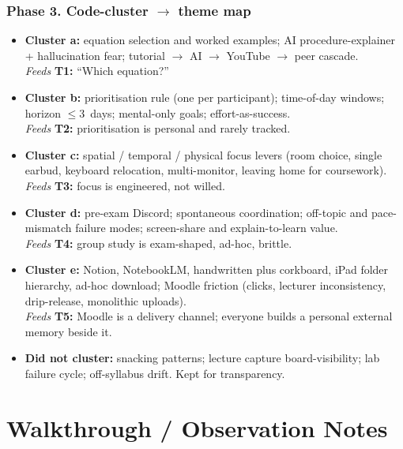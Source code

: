 \documentclass[a4paper,11pt]{article}
\begin{document}
\subsubsection*{Phase 3. Code-cluster $\rightarrow$ theme map}
\label{app:analysis-clusters}

\begin{itemize}[leftmargin=1.2em,itemsep=4pt]
    \item \textbf{Cluster a:} equation selection and worked
          examples; AI procedure-explainer + hallucination fear;
          tutorial $\rightarrow$ AI $\rightarrow$ YouTube
          $\rightarrow$ peer cascade.
          \\\emph{Feeds} \textbf{T1:} ``Which equation?''
    \item \textbf{Cluster b:} prioritisation rule (one per
          participant); time-of-day windows; horizon ${\leq}3$~days;
          mental-only goals; effort-as-success.
          \\\emph{Feeds} \textbf{T2:} prioritisation is personal and
          rarely tracked.
    \item \textbf{Cluster c:} spatial / temporal / physical
          focus levers (room choice, single earbud, keyboard
          relocation, multi-monitor, leaving home for coursework).
          \\\emph{Feeds} \textbf{T3:} focus is engineered, not willed.
    \item \textbf{Cluster d:} pre-exam Discord; spontaneous
          coordination; off-topic and pace-mismatch failure modes;
          screen-share and explain-to-learn value.
          \\\emph{Feeds} \textbf{T4:} group study is exam-shaped,
          ad-hoc, brittle.
    \item \textbf{Cluster e:} Notion, NotebookLM,
          handwritten plus corkboard, iPad folder hierarchy, ad-hoc
          download; Moodle friction (clicks, lecturer inconsistency,
          drip-release, monolithic uploads).
          \\\emph{Feeds} \textbf{T5:} Moodle is a delivery channel;
          everyone builds a personal external memory beside it.
    \item \textbf{Did not cluster:} snacking patterns; lecture
          capture board-visibility; lab failure cycle; off-syllabus
          drift. Kept for transparency.
\end{itemize}

\newpage
\section{Walkthrough / Observation Notes}\label{app:observation}
\end{document}
